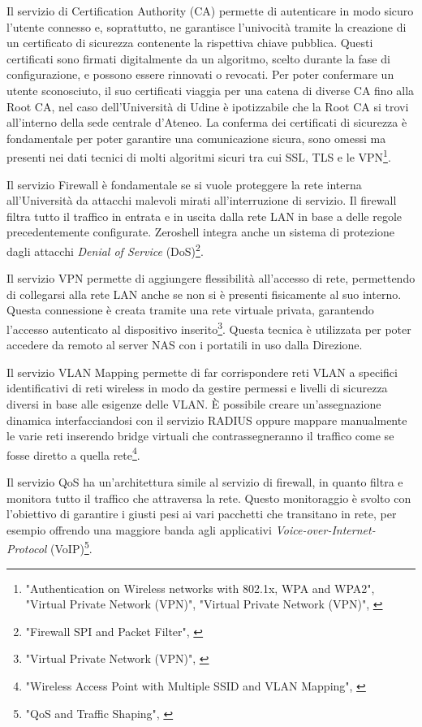             \par
                Il servizio di Certification Authority (CA) permette di autenticare in modo sicuro l'utente connesso e, soprattutto, ne garantisce l'univocità tramite la creazione di un certificato di sicurezza contenente la rispettiva chiave pubblica. Questi certificati sono firmati digitalmente da un algoritmo, scelto durante la fase di configurazione, e possono essere rinnovati o revocati. Per poter confermare un utente sconosciuto, il suo certificati viaggia per una catena di diverse CA fino alla Root CA, nel caso dell'Università di Udine è ipotizzabile che la Root CA si trovi all'interno della sede centrale d'Ateneo. \newline
                La conferma dei certificati di sicurezza è fondamentale per poter garantire una comunicazione sicura, sono omessi ma presenti nei dati tecnici di molti algoritmi sicuri tra cui SSL, TLS e le VPN\footnote{"Authentication on Wireless networks with 802.1x, WPA and WPA2", "Virtual Private Network (VPN)", "Virtual Private Network (VPN)", \cite{ZeroshellLinuxRouter2021}}. 
            \par
                Il servizio Firewall è fondamentale se si vuole proteggere la rete interna all'Università da attacchi malevoli mirati all'interruzione di servizio. Il firewall filtra tutto il traffico in entrata e in uscita dalla rete LAN in base a delle regole precedentemente configurate. Zeroshell integra anche un sistema di protezione dagli attacchi \textit{Denial of Service} (DoS)\footnote{"Firewall SPI and Packet Filter", \cite{ZeroshellLinuxRouter2021}}.
            \par
                Il servizio VPN permette di aggiungere flessibilità all'accesso di rete, permettendo di collegarsi alla rete LAN anche se non si è presenti fisicamente al suo interno. Questa connessione è creata tramite una rete virtuale privata, garantendo l'accesso autenticato al dispositivo inserito\footnote{"Virtual Private Network (VPN)", \cite{ZeroshellLinuxRouter2021}}. Questa tecnica è utilizzata per poter accedere da remoto al server NAS con i portatili in uso dalla Direzione. 
            \par
                Il servizio VLAN Mapping permette di far corrispondere reti VLAN a specifici identificativi di reti wireless in modo da gestire permessi e livelli di sicurezza diversi in base alle esigenze delle VLAN. È possibile creare un'assegnazione dinamica interfacciandosi con il servizio RADIUS oppure mappare manualmente le varie reti inserendo bridge virtuali che contrassegneranno il traffico come se fosse diretto a quella rete\footnote{"Wireless Access Point with Multiple SSID and VLAN Mapping", \cite{ZeroshellLinuxRouter2021}}. 
            \par
                Il servizio QoS ha un'architettura simile al servizio di firewall, in quanto filtra e monitora tutto il traffico che attraversa la rete. Questo monitoraggio è svolto con l'obiettivo di garantire i giusti pesi ai vari pacchetti che transitano in rete, per esempio offrendo una maggiore banda agli applicativi \textit{Voice-over-Internet-Protocol} (VoIP)\footnote{"QoS and Traffic Shaping", \cite{ZeroshellLinuxRouter2021}}. 